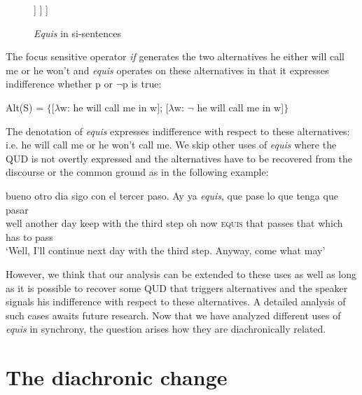 \documentclass[output=paper]{langsci/langscibook}
\begin{document}

\begin{figure}
	\caption{\textit{Equis} in si-sentences\label{fig:kellert:tree3}}
	\begin{forest}
		[DiscourseP
			[\textit{Equis}] [CP
				[C\textsuperscript{0}\\\textit{si}][TP
				[\textit{me llama},roof]
		    	]
			]
		]
	\end{forest}
\end{figure}

The focus sensitive operator \textit{if} generates the two alternatives he either will call me or he won’t and \textit{equis} operates on these alternatives in that it expresses indifference whether p or $¬$p is true:

\ea Alt(S) = $\lbrace${[}$\lambda$w: he will call me in w{]}; {[}$\lambda$w: $¬$ he will call me in w{]}$\rbrace$
\z

The denotation of \textit{equis} expresses indifference with respect to these alternatives: i.e. he will call me or he won’t call me. We skip other uses of \textit{equis} where the QUD is not overtly expressed and the alternatives have to be recovered from the discourse or the common ground as in the following example:

\ea
\gll bueno otro dia sigo con el tercer paso. Ay ya \textit{equis}, que pase lo que tenga que pasar\\
well another day keep with the third step oh now \textsc{equis} that passes that which has to pass\\
\glt ‘Well, I’ll continue next day with the third step. Anyway, come what may’
\z

However, we think that our analysis can be extended to these uses as well as long as it is possible to recover some QUD that triggers alternatives and the speaker signals his indifference with respect to these alternatives. A detailed analysis of such cases awaits future research.
Now that we have analyzed different uses of \textit{equis} in synchrony, the question arises how they are diachronically related.

\section{The diachronic change}\label{sec:kellert:4}
\end{document}
